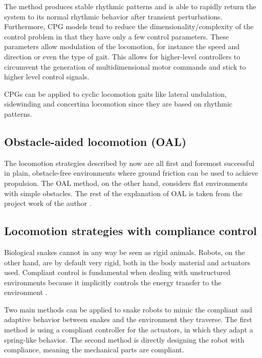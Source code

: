 The method produces stable rhythmic patterns and is able to rapidly return the system to its normal rhythmic behavior after transient perturbations. Furthermore, CPG models tend to reduce the dimensionality/complexity of the control problem in that they have only a few control parameters. These parameters allow modulation of the locomotion, for instance the speed and direction or even the type of gait. This allows for higher-level controllers to circumvent the generation of multidimensional motor commands and stick to higher level control signals.

CPGs can be applied to cyclic locomotion gaits like lateral undulation, sidewinding and concertina locomotion since they are based on rhythmic patterns.

\subsection{Obstacle-aided locomotion (OAL)}\label{subsec:OAL}

The locomotion strategies described by now are all first and foremost successful in plain, obstacle-free environments where ground friction can be used to achieve propulsion. The OAL method, on the other hand, considers flat environments with simple obstacles. The rest of the explanation of OAL is taken from the project work of the author \cite{AtussaProsjektoppgp}.





\subsection{Locomotion strategies with compliance control}\label{subsec:compliance-control}

Biological snakes cannot in any way be seen as rigid animals. Robots, on the other hand, are by default very rigid, both in the body material and actuators used.
Compliant control is fundamental when dealing with unstructured environments because it implicitly controls the energy transfer to the environment \cite{calanca2015review}.

Two main methods can be applied to snake robots to mimic the compliant and adaptive behavior between snakes and the environment they traverse. The first method is using a compliant controller for the actuators, in which they adapt a spring-like behavior. The second method is directly designing the robot with compliance, meaning the mechanical parts are compliant.

